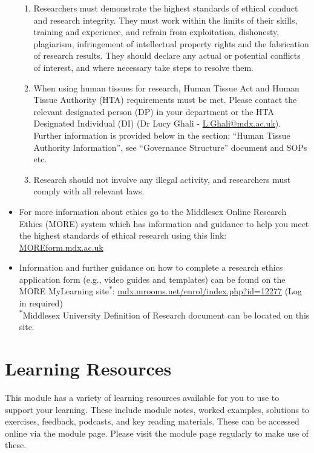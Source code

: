 \documentclass{MDXHandbook}
\begin{document}
\begin{itemize}
\begin{enumerate}
			\item Researchers must demonstrate the highest standards of ethical conduct and research integrity. They must work within the limits of their skills, training and experience, and refrain from exploitation, dishonesty, plagiarism, infringement of intellectual property rights and the fabrication of research results. They should declare any actual or potential conflicts of interest, and where necessary take steps to resolve them. 
			\item When using human tissues for research, Human Tissue Act and Human Tissue Authority (HTA) requirements must be met. Please contact the relevant designated person (DP) in your department or the HTA Designated Individual (DI) (Dr Lucy Ghali - \href{mailto:L.Ghali@mdx.ac.uk}{L.Ghali@mdx.ac.uk}). Further information is provided below in the section: ``Human Tissue Authority Information'', see ``Governance Structure'' document and SOPs etc.
			\item Research should not involve any illegal activity, and researchers must comply with all relevant laws.
		\end{enumerate}
	\item For more information about ethics go to the Middlesex Online Research Ethics (MORE) system which has information and guidance to help you meet the highest standards of ethical research using this link: \url{MOREform.mdx.ac.uk}
	\item Information and further guidance on how to complete a research ethics application form (e.g., video guides and templates) can be found on the MORE MyLearning site\textsuperscript{$\ast$}: \url{mdx.mrooms.net/enrol/index.php?id=12277} (Log in required)\\ 
\textsuperscript{$\ast$}Middlesex University Definition of Research document can be located on this site.
\end{itemize}



\section{Learning Resources}

This module has a variety of learning resources available for you to use to support your learning. These include module notes, worked examples, solutions to exercises, feedback, podcasts, and key reading materials. These can be accessed online via the module page. Please visit the module page regularly to make use of these.
\end{document}
